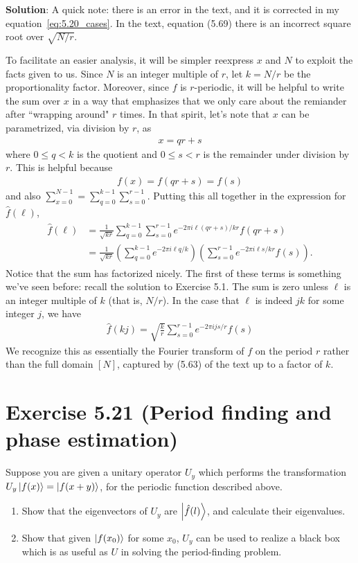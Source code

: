 \documentclass{book}
\begin{document}
    \textbf{Solution}: A quick note: there is an error in the text, and it is corrected in my equation~\eqref{eq:5.20_cases}. In the text, equation (5.69) there is an incorrect square root over $\sqrt{N/r}$. 

    To facilitate an easier analysis, it will be simpler reexpress $x$ and $N$ to exploit the facts given to us. Since $N$ is an integer multiple of $r$, let $k = N/r$ be the proportionality factor. Moreover, since $f$ is $r$-periodic, it will be helpful to write the sum over $x$ in a way that emphasizes that we only care about the remiander after ``wrapping around" $r$ times. In that spirit, let's note that $x$ can be parametrized, via division by $r$, as
    \begin{align}
        x = qr + s
    \end{align}
    where $0 \leq q < k$ is the quotient and $0 \leq s < r$ is the remainder under division by $r$. This is helpful because
    \begin{align}
        f(x) = f(qr + s) = f(s)
    \end{align}
    and also
    $\sum_{x=0}^{N-1} = \sum_{q=0}^{k-1} \sum_{s=0}^{r-1}$.
    Putting this all together in the expression for $\hat{f}(\ell)$,
    \begin{align}
    \begin{aligned}
        \hat{f}(\ell) &= \frac{1}{\sqrt{kr}} \sum_{q=0}^{k-1} \sum_{s=0}^{r-1} e^{-2\pi i \ell (qr+s)/kr} f(qr + s) \\
        &= \frac{1}{\sqrt{kr}} \left(\sum_{q=0}^{k-1} e^{-2\pi i \ell q/k}\right) \left(\sum_{s=0}^{r-1} e^{-2\pi i \ell s/ kr} f(s)\right).
    \end{aligned}
    \end{align}
    Notice that the sum has factorized nicely. The first of these terms is something we've seen before: recall the solution to Exercise 5.1. The sum is zero unless $\ell$ is an integer multiple of $k$ (that is, $N/r$). In the case that $\ell$ is indeed $jk$ for some integer $j$, we have
    \begin{align}
        \hat{f}(kj) = \sqrt{\frac{k}{r}} \sum_{s=0}^{r-1} e^{-2\pi i j s/ r} f(s)
    \end{align}
    We recognize this as essentially the Fourier transform of $f$ on the period $r$ rather than the full domain $[N]$, captured by (5.63) of the text up to a factor of $k$.
    
\section*{Exercise 5.21 (Period finding and phase estimation)}
    Suppose you are given a unitary operator $U_y$ which performs the transformation $U_y\ket{f(x)} = \ket{f(x+y)}$, for the periodic function described above.
    \begin{enumerate}
        \item Show that the eigenvectors of $U_y$ are $\ket{\hat{f}(l)}$, and calculate their eigenvalues.
        \item Show that given $\ket{f(x_0)}$ for some $x_0$, $U_y$ can be used to realize a black box which is as useful as $U$ in solving the period-finding problem.
    \end{enumerate}
    
\end{document}

